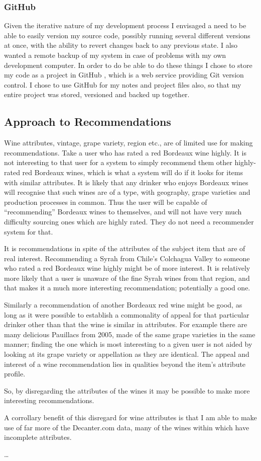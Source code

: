 \subsubsection{GitHub}

Given the iterative nature of my development process I envisaged a need to be able to easily version my source code, possibly running several different versions at once, with the ability to revert changes back to any previous state. I also wanted a remote backup of my system in case of problems with my own development computer. In order to do be able to do these things I chose to store my code as a project in GitHub \cite{GitHub}, which is a web service providing Git version control. I chose to use GitHub for my notes and project files also, so that my entire project was stored, versioned and backed up together.

\subsection{Approach to Recommendations}

Wine attributes, vintage, grape variety, region etc., are of limited use for making recommendations. Take a user who has rated a red Bordeaux wine highly. It is not interesting to that user for a system to simply recommend them other highly-rated red Bordeaux wines, which is what a system will do if it looks for items with similar attributes. It is likely that any drinker who enjoys Bordeaux wines will recognise that such wines are of a type, with geography, grape varieties and production processes in common. Thus the user will be capable of ``recommending'' Bordeaux wines to themselves, and will not have very much difficulty sourcing ones which are highly rated. They do not need a recommender system for that.

It is recommendations in spite of the attributes of the subject item that are of real interest. Recommending a Syrah from Chile's Colchagua Valley to someone who rated a red Bordeaux wine highly might be of more interest. It is relatively more likely that a user is unaware of the fine Syrah wines from that region, and that makes it a much more interesting recommendation; potentially a good one.

Similarly a recommendation of another Bordeaux red wine might be good, as long as it were possible to establish a commonality of appeal for that particular drinker other than that the wine is similar in attributes. For example there are many delicious Pauillacs from 2005, made of the same grape varieties in the same manner; finding the one which is most interesting to a given user is not aided by looking at its grape variety or appellation as they are identical. The appeal and interest of a wine recommendation lies in qualities beyond the item's attribute profile.

So, by disregarding the attributes of the wines it may be possible to make more interesting recommendations.

A corrollary benefit of this disregard for wine attributes is that I am able to make use of far more of the Decanter.com data, many of the wines within which have incomplete attributes.

\ldots
